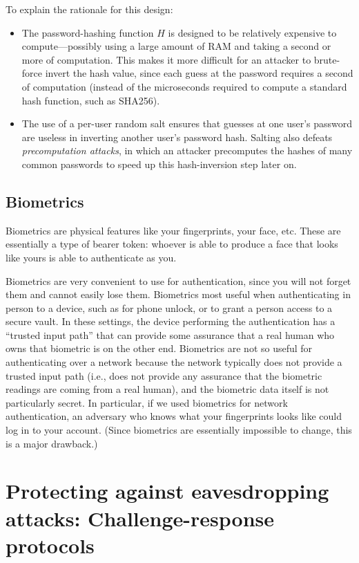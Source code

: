 \documentclass[
  letterpaper,
]{scrbook}
\providecommand{\tightlist}{%
  \setlength{\itemsep}{0pt}\setlength{\parskip}{0pt}}
\theoremstyle{definition}
\theoremstyle{plain}
\theoremstyle{plain}
\theoremstyle{remark}
\begin{document}
To explain the rationale for this design:

\begin{itemize}
\tightlist
\item
  The password-hashing function \(H\) is designed to be relatively
  expensive to compute---possibly using a large amount of RAM and taking
  a second or more of computation. This makes it more difficult for an
  attacker to brute-force invert the hash value, since each guess at the
  password requires a second of computation (instead of the microseconds
  required to compute a standard hash function, such as SHA256).
\item
  The use of a per-user random salt ensures that guesses at one user's
  password are useless in inverting another user's password hash.
  Salting also defeats \emph{precomputation attacks}, in which an
  attacker precomputes the hashes of many common passwords to speed up
  this hash-inversion step later on.
\end{itemize}

\subsection{Biometrics}\label{biometrics}

Biometrics are physical features like your fingerprints, your face, etc.
These are essentially a type of bearer token: whoever is able to produce
a face that looks like yours is able to authenticate as you.

Biometrics are very convenient to use for authentication, since you will
not forget them and cannot easily lose them. Biometrics most useful when
authenticating in person to a device, such as for phone unlock, or to
grant a person access to a secure vault. In these settings, the device
performing the authentication has a ``trusted input path'' that can
provide some assurance that a real human who owns that biometric is on
the other end. Biometrics are not so useful for authenticating over a
network because the network typically does not provide a trusted input
path (i.e., does not provide any assurance that the biometric readings
are coming from a real human), and the biometric data itself is not
particularly secret. In particular, if we used biometrics for network
authentication, an adversary who knows what your fingerprints looks like
could log in to your account. (Since biometrics are essentially
impossible to change, this is a major drawback.)

\section{Protecting against eavesdropping attacks: Challenge-response
protocols}\label{protecting-against-eavesdropping-attacks-challenge-response-protocols}
\end{document}
